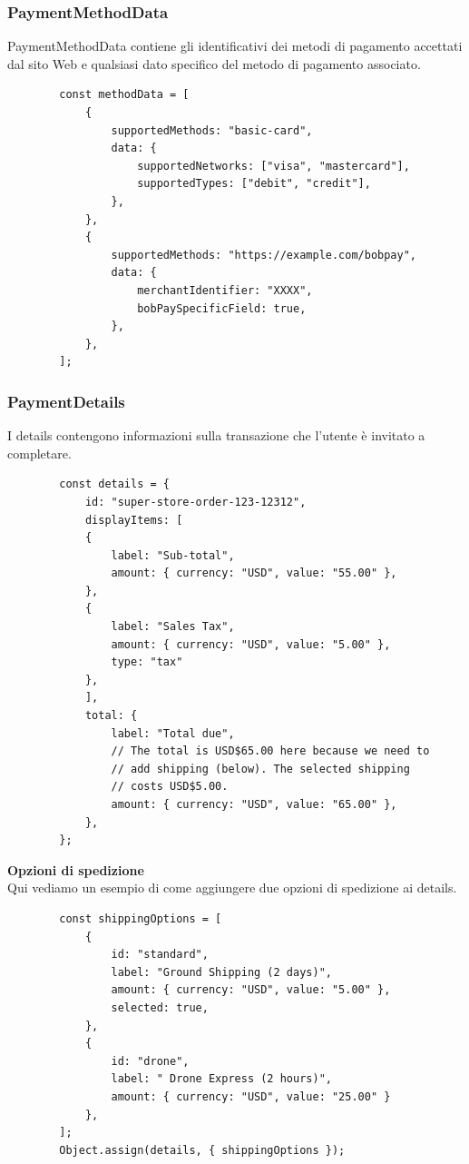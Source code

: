 \documentclass[italian]{article}
\begin{document}
	\subsubsection{PaymentMethodData}
	PaymentMethodData contiene gli identificativi dei metodi di pagamento accettati dal sito Web e qualsiasi dato specifico del metodo di pagamento associato.
	\begin{lstlisting}
		const methodData = [
			{
				supportedMethods: "basic-card",
				data: {
					supportedNetworks: ["visa", "mastercard"],
					supportedTypes: ["debit", "credit"],
				},
			},
			{
				supportedMethods: "https://example.com/bobpay",
				data: {
					merchantIdentifier: "XXXX",
					bobPaySpecificField: true,
				},
			},
		];
	\end{lstlisting}
	
	\subsubsection{PaymentDetails}
	I details contengono informazioni sulla transazione che l'utente è invitato a completare.
	\begin{lstlisting}
		const details = {
			id: "super-store-order-123-12312",
			displayItems: [
			{
				label: "Sub-total",
				amount: { currency: "USD", value: "55.00" },
			},
			{
				label: "Sales Tax",
				amount: { currency: "USD", value: "5.00" },
				type: "tax"
			},
			],
			total: {
				label: "Total due",
				// The total is USD$65.00 here because we need to
				// add shipping (below). The selected shipping
				// costs USD$5.00.
				amount: { currency: "USD", value: "65.00" },
			},
		};
	\end{lstlisting}
	
	\textbf{Opzioni di spedizione}
	\\
	Qui vediamo un esempio di come aggiungere due opzioni di spedizione ai details.
	\begin{lstlisting}
		const shippingOptions = [
			{
				id: "standard",
				label: "Ground Shipping (2 days)",
				amount: { currency: "USD", value: "5.00" },
				selected: true,
			},
			{
				id: "drone",
				label: " Drone Express (2 hours)",
				amount: { currency: "USD", value: "25.00" }
			},
		];
		Object.assign(details, { shippingOptions });
	\end{lstlisting}
	
\end{document}
